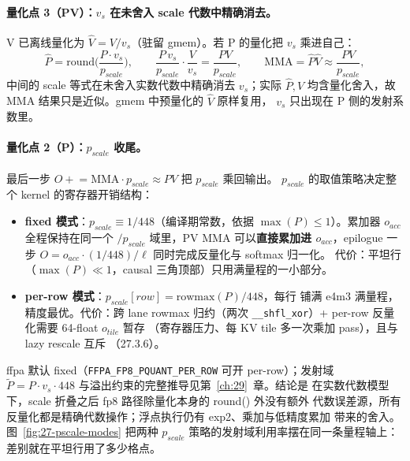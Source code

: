 \paragraph{量化点 3（PV）：$v_s$ 在未舍入 scale 代数中精确消去。}
V 已离线量化为 $\hat{V} = V / v_s$（驻留 gmem）。若 P 的量化把 $v_s$ 乘进自己：
\begin{equation}
  \hat{P} = \mathrm{round}\!\Big(\frac{P \cdot v_s}{p_{scale}}\Big),
  \qquad
  \frac{P\, v_s}{p_{scale}} \cdot \frac{V}{v_s} = \frac{PV}{p_{scale}},
  \qquad
  \mathrm{MMA} = \hat{P}\hat{V} \approx \frac{PV}{p_{scale}},
  \label{eq:27-vs-cancel}
\end{equation}
中间的 scale 等式在未舍入实数代数中精确消去 $v_s$；实际 $\hat P,\hat V$
均含量化舍入，故 MMA 结果只是近似。gmem 中预量化的 $\hat{V}$ 原样复用，
$v_s$ 只出现在 P 侧的发射系数里。

\paragraph{量化点 2（P）：$p_{scale}$ 收尾。}
最后一步 $O \mathrel{+}= \mathrm{MMA} \cdot p_{scale} \approx PV$ 把 $p_{scale}$ 乘回输出。
$p_{scale}$ 的取值策略决定整个 kernel 的寄存器开销结构：
\begin{itemize}[itemsep=2pt,topsep=2pt]
  \item \textbf{fixed 模式}：$p_{scale} \equiv 1/448$（编译期常数，依据
        $\max(P) \le 1$）。累加器 $o_{acc}$ 全程保持在同一个
        $/p_{scale}$ 域里，PV MMA 可以\textbf{直接累加进 $o_{acc}$}，epilogue
        一步 $O = o_{acc} \cdot (1/448) / \ell$ 同时完成反量化与 softmax 归一化。
        代价：平坦行（$\max(P) \ll 1$，causal 三角顶部）只用满量程的一小部分。
  \item \textbf{per-row 模式}：$p_{scale}[row] = \mathrm{rowmax}(P)/448$，每行
        铺满 e4m3 满量程，精度最优。代价：跨 lane rowmax 归约（两次
        \texttt{\_\_shfl\_xor}）+ per-row 反量化需要 64-float $o_{tile}$ 暂存
        （寄存器压力、每 KV tile 多一次乘加 pass），且与 lazy rescale 互斥
        （27.3.6）。
\end{itemize}
ffpa 默认 fixed（\texttt{FFPA\_FP8\_PQUANT\_PER\_ROW} 可开 per-row）；发射域
$\tilde{P} = P \cdot v_s \cdot 448$ 与溢出约束的完整推导见第~\ref{ch:29}~章。结论是
在实数代数模型下，scale 折叠之后 fp8 路径除量化本身的 round() 外没有额外
代数误差源，所有反量化都是精确代数操作；浮点执行仍有 exp2、乘加与低精度累加
带来的舍入。图~\ref{fig:27-pscale-modes} 把两种
$p_{scale}$ 策略的发射域利用率摆在同一条量程轴上：差别就在平坦行用了多少格点。

